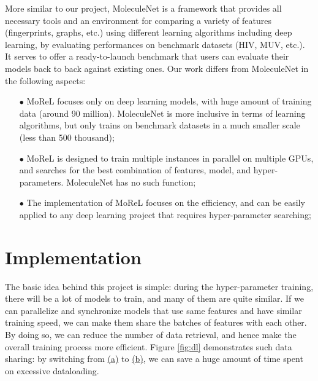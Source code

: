 \documentclass[conference]{IEEEtran}
\begin{document}
More similar to our project, MoleculeNet \cite{molnet} is a framework that provides all necessary tools and an environment for comparing a variety of features (fingerprints, graphs, etc.) using different learning algorithms including deep learning, by evaluating performances on benchmark datasets (HIV, MUV, etc.). 
It serves to offer a ready-to-launch benchmark that users can evaluate their models back to back against existing ones. 
Our work differs from MoleculeNet in the following aspects:
\begin{itemize}
	\item[$\bullet$]  MoReL focuses only on deep learning models, with huge amount of training data (around 90 million). MoleculeNet is more inclusive in terms of learning algorithms, but only trains on benchmark datasets in a much smaller scale (less than 500 thousand);
	\item[$\bullet$]  MoReL is designed to train multiple instances in parallel on multiple GPUs, and searches for the best combination of features, model, and hyper-parameters. MoleculeNet has no such function;
	\item[$\bullet$]  The implementation of MoReL focuses on the efficiency, and can be easily applied to any deep learning project that requires hyper-parameter searching; 
\end{itemize}

\section{Implementation} \label{sec_impl} 

The basic idea behind this project is simple: during the hyper-parameter training, there will be a lot of models to train, and many of them are quite similar. 
If we can parallelize and synchronize models that use same features and have similar training speed, we can make them share the batches of features with each other. 
By doing so, we can reduce the number of data retrieval, and hence make the overall training process more efficient. 
Figure \ref{fig:dl} demonstrates such data sharing: by switching from \hyperref[dl_a]{(a)} to \hyperref[dl_b]{(b)}, we can save a huge amount of time spent on excessive dataloading.
\end{document}
